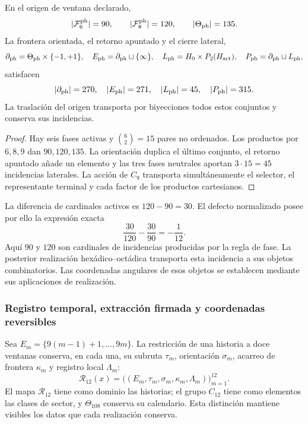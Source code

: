 \begin{theorem}
\label{ii:tpk-semicorona}
En el origen de ventana declarado,
\[
 |\mathcal F_6^{\rm ph}|=90,\qquad
 |\mathcal F_8^{\rm ph}|=120,\qquad
 |\Theta_{\rm ph}|=135.
\]
La frontera orientada, el retorno apuntado y el cierre lateral,
\[
 \partial_{\rm ph}=\Theta_{\rm ph}\times\{-1,+1\},\quad
 E_{\rm ph}=\partial_{\rm ph}\sqcup\{\infty\},\quad
 L_{\rm ph}=H_0\times P_2(H_{\rm act}),\quad
 P_{\rm ph}=\partial_{\rm ph}\sqcup L_{\rm ph},
\]
satisfacen
\[
 |\partial_{\rm ph}|=270,\quad |E_{\rm ph}|=271,\quad
 |L_{\rm ph}|=45,\quad |P_{\rm ph}|=315.
\]
La traslación del origen transporta por biyecciones todos estos conjuntos
y conserva sus incidencias.
\end{theorem}
\begin{proof}
Hay seis fases activas y \(\binom62=15\) pares no ordenados.
Los productos por \(6,8,9\) dan \(90,120,135\). La orientación
duplica el último conjunto, el retorno apuntado añade un elemento y las
tres fases neutrales aportan \(3\cdot15=45\) incidencias laterales.
La acción de \(C_9\) transporta simultáneamente el selector, el
representante terminal y cada factor de los productos cartesianos.
\end{proof}

La diferencia de cardinales activos es \(120-90=30\). El defecto
normalizado posee por ello la expresión exacta
\begin{equation}
 \frac{30}{120}-\frac{30}{90}=-\frac1{12}.
 \label{ii:tpk-defecto-incidencia}
\end{equation}
Aquí \(90\) y \(120\) son cardinales de incidencias producidas por la
regla de fase. La posterior realización hexádico--octádica transporta esta
incidencia a sus objetos combinatorios. Las coordenadas angulares de esos
objetos se establecen mediante sus aplicaciones de realización.

\subsubsection{Registro temporal, extracción firmada y coordenadas reversibles}

Sea \(E_m=\{9(m-1)+1,\ldots,9m\}\). La restricción de una historia
a doce ventanas conserva, en cada una, su subruta \(\tau_m\),
orientación \(\sigma_m\), acarreo de frontera \(\kappa_m\) y registro
local \(\Lambda_m\):
\[
 \mathcal R_{12}(x)
 =\bigl((E_m,\tau_m,\sigma_m,\kappa_m,\Lambda_m)\bigr)_{m=1}^{12}.
\]
El mapa \(\mathcal R_{12}\) tiene como dominio las historias; el grupo
\(C_{12}\) tiene como elementos las clases de sector, y
\(\Theta_{108}\) conserva su calendario. Esta distinción mantiene
visibles los datos que cada realización conserva.

